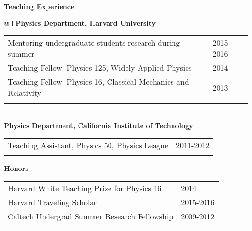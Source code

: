 \documentclass[letterpaper,11pt,oneside]{article}
\begin{document}
\raggedright
\textbf{\Large{Teaching Experience}} \\
\vspace{-0.5cm}
 \normalsize
\begin{flushleft}
\hspace{1cm}
 \begin{tabular}{@{} l}
    \textbf{Physics Department, Harvard University} \\ 
    \begin{tabular}{@{} l l }
 Mentoring undergraduate students research during summer & 2015-2016\\
 Teaching Fellow, Physics 125, Widely Applied Physics & 2014\\
 Teaching Fellow, Physics 16, Classical Mechanics and Relativity & 2013\\
    \hspace{0.8\linewidth} & \hspace{0.1\linewidth} \\
     \end{tabular}
     \\
     \textbf{Physics Department, California Institute of Technology} \\
     \begin{tabular}{@{} l l }
 Teaching Assistant, Physics 50, Physics League & 2011-2012\\
    \hspace{0.8\linewidth} & \hspace{0.1\linewidth} \\
      \end{tabular}
      \end{tabular}
\end{flushleft}

\raggedright
 \textbf{\Large{Honors}} \\
\vspace{-0.5cm}
 \normalsize
\begin{flushleft}
\hspace{1cm}
\begin{tabular}{@{} l l }
 Harvard White Teaching Prize for Physics 16 & 2014\\
 Harvard Traveling Scholar & 2015-2016\\
 Caltech Undergrad Summer Research Fellowship & 2009-2012\\
    \hspace{0.8\linewidth} & \hspace{0.1\linewidth} \\
 \end{tabular}
\end{flushleft}
\end{document}
